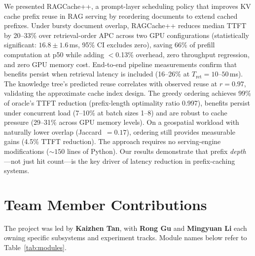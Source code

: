 \documentclass{article}
\begin{document}
We presented RAGCache++, a prompt-layer scheduling policy that improves KV cache prefix reuse in RAG serving by reordering documents to extend cached prefixes. Under bursty document overlap, RAGCache++ reduces median TTFT by 20--33\% over retrieval-order APC across two GPU configurations (statistically significant: $16.8 \pm 1.6$\,ms, 95\% CI excludes zero), saving 66\% of prefill computation at p50 while adding $<$0.13\% overhead, zero throughput regression, and zero GPU memory cost. End-to-end pipeline measurements confirm that benefits persist when retrieval latency is included (16--26\% at $T_{\text{ret}} = 10$--$50$\,ms). The knowledge tree's predicted reuse correlates with observed reuse at $r = 0.97$, validating the approximate cache index design. The greedy ordering achieves 99\% of oracle's TTFT reduction (prefix-length optimality ratio 0.997), benefits persist under concurrent load (7--10\% at batch sizes 1--8) and are robust to cache pressure (29--31\% across GPU memory levels). On a geospatial workload with naturally lower overlap (Jaccard~$= 0.17$), ordering still provides measurable gains (4.5\% TTFT reduction). The approach requires no serving-engine modifications (${\sim}150$ lines of Python). Our results demonstrate that prefix \emph{depth}---not just hit count---is the key driver of latency reduction in prefix-caching systems.

\section{Team Member Contributions}
\label{sec:contrib}

The project was led by \textbf{Kaizhen Tan}, with \textbf{Rong Gu} and \textbf{Mingyuan Li} each owning specific subsystems and experiment tracks. Module names below refer to Table~\ref{tab:modules}.
\end{document}
